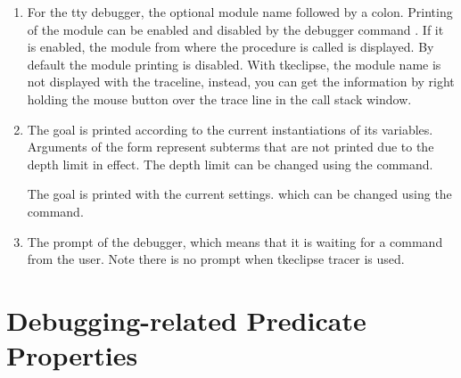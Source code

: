 \begin{enumerate}
\item For the tty debugger, the optional module name followed by a colon.
Printing of the module can be enabled and disabled by the debugger
command .
If it is enabled, the module from where the procedure is called is
displayed.  By default the module printing is disabled. With tkeclipse, the
module name is not displayed with the traceline, instead, you can get the
information by right holding the mouse button over the trace line in the
call stack window.

\item The goal is printed according to the current instantiations
of its variables.  Arguments of the form  represent subterms
that are not printed due to the depth limit in effect.
The depth limit can be changed using the
\notation{<} command.

The goal is printed with the current  settings.
which can be changed using the
 command.

\item The prompt of the debugger, which means that it is waiting
for a command from the user. Note there is no prompt when tkeclipse tracer
is used.
\end{enumerate}

\section{Debugging-related Predicate Properties}

